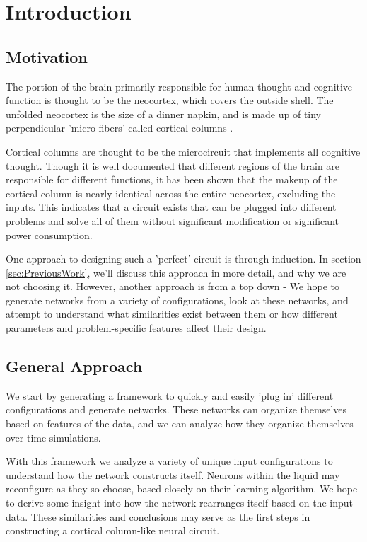 \section{Introduction} \label{sec:Introduction}

\subsection{Motivation}

The portion of the brain primarily responsible for human thought and cognitive
function is thought to be the neocortex, which covers the outside shell. The
unfolded neocortex is the size of a dinner napkin, and is made up of tiny
perpendicular 'micro-fibers' called cortical columns \cite{Mountcastle}.

Cortical columns are thought to be the microcircuit that implements all
cognitive thought. Though it is well documented that different regions of the
brain are responsible for different functions, it has been shown \cite{Hawkins}
that the makeup of the cortical column is nearly identical across the entire
neocortex, excluding the inputs. This indicates that a circuit exists that can
be plugged into different problems and solve all of them without significant
modification or significant power consumption.

One approach to designing such a 'perfect' circuit is through induction. In
section \ref{sec:PreviousWork}, we'll discuss this approach in more detail, and
why we are not choosing it. However, another approach is from a top down - We
hope to generate networks from a variety of configurations, look at these
networks, and attempt to understand what similarities exist between them or how
different parameters and problem-specific features affect their design.

\subsection{General Approach}

We start by generating a framework to quickly and easily 'plug in' different
configurations and generate networks. These networks can organize themselves
based on features of the data, and we can analyze how they organize themselves
over time simulations.

With this framework we analyze a variety of unique input configurations to
understand how the network constructs itself. Neurons within the liquid may
reconfigure as they so choose, based closely on their learning algorithm. We
hope to derive some insight into how the network rearranges itself based on the
input data. These similarities and conclusions may serve as the first steps in
constructing a cortical column-like neural circuit.

